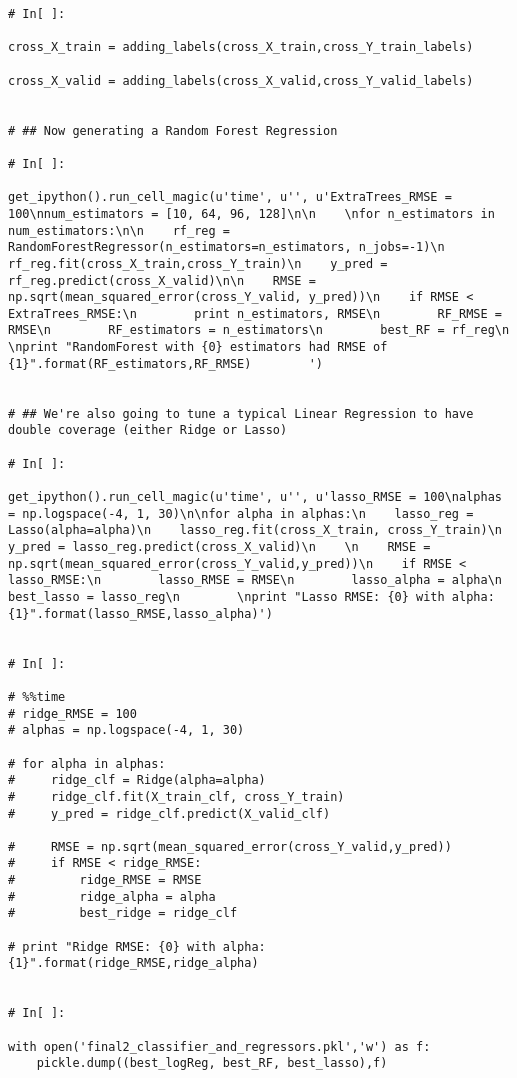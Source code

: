 \documentclass[11pt, oneside]{article}   	%
\begin{document}
\begin{lstlisting}
# In[ ]:

cross_X_train = adding_labels(cross_X_train,cross_Y_train_labels)

cross_X_valid = adding_labels(cross_X_valid,cross_Y_valid_labels)


# ## Now generating a Random Forest Regression

# In[ ]:

get_ipython().run_cell_magic(u'time', u'', u'ExtraTrees_RMSE = 100\nnum_estimators = [10, 64, 96, 128]\n\n    \nfor n_estimators in num_estimators:\n\n    rf_reg = RandomForestRegressor(n_estimators=n_estimators, n_jobs=-1)\n    rf_reg.fit(cross_X_train,cross_Y_train)\n    y_pred = rf_reg.predict(cross_X_valid)\n\n    RMSE = np.sqrt(mean_squared_error(cross_Y_valid, y_pred))\n    if RMSE < ExtraTrees_RMSE:\n        print n_estimators, RMSE\n        RF_RMSE = RMSE\n        RF_estimators = n_estimators\n        best_RF = rf_reg\n            \nprint "RandomForest with {0} estimators had RMSE of {1}".format(RF_estimators,RF_RMSE)        ')


# ## We're also going to tune a typical Linear Regression to have double coverage (either Ridge or Lasso)

# In[ ]:

get_ipython().run_cell_magic(u'time', u'', u'lasso_RMSE = 100\nalphas = np.logspace(-4, 1, 30)\n\nfor alpha in alphas:\n    lasso_reg = Lasso(alpha=alpha)\n    lasso_reg.fit(cross_X_train, cross_Y_train)\n    y_pred = lasso_reg.predict(cross_X_valid)\n    \n    RMSE = np.sqrt(mean_squared_error(cross_Y_valid,y_pred))\n    if RMSE < lasso_RMSE:\n        lasso_RMSE = RMSE\n        lasso_alpha = alpha\n        best_lasso = lasso_reg\n        \nprint "Lasso RMSE: {0} with alpha: {1}".format(lasso_RMSE,lasso_alpha)')


# In[ ]:

# %%time
# ridge_RMSE = 100
# alphas = np.logspace(-4, 1, 30)

# for alpha in alphas:
#     ridge_clf = Ridge(alpha=alpha)
#     ridge_clf.fit(X_train_clf, cross_Y_train)
#     y_pred = ridge_clf.predict(X_valid_clf)
    
#     RMSE = np.sqrt(mean_squared_error(cross_Y_valid,y_pred))
#     if RMSE < ridge_RMSE:
#         ridge_RMSE = RMSE
#         ridge_alpha = alpha
#         best_ridge = ridge_clf
        
# print "Ridge RMSE: {0} with alpha: {1}".format(ridge_RMSE,ridge_alpha)


# In[ ]:

with open('final2_classifier_and_regressors.pkl','w') as f:
    pickle.dump((best_logReg, best_RF, best_lasso),f)



\end{lstlisting}
\end{document}
